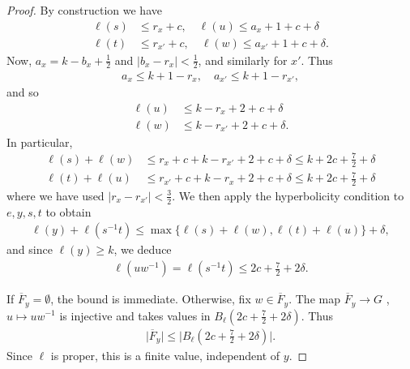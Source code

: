\documentclass[12pt,a4paper,oneside,final,reqno]{amsart}
\theoremstyle{plain}
\theoremstyle{definition}
\begin{document}
\begin{proof}
    By construction we have
    \begin{align*}
        \ell(s) &\leq r_{x} +c, \quad \ell(u) \leq a_x + 1 +c +\delta \\
        \ell(t) &\leq r_{x'} + c, \quad \ell(w) \leq a_{x'} +1+c+\delta.
    \end{align*}
    Now, $a_x = k - b_x + \frac{1}{2}$ and $|b_x - r_x | < \frac{1}{2}$, and similarly for $x'$. Thus
    \begin{align*}
        a_x \leq k+1 - r_x , \quad a_{x'} \leq k+1 - r_{x'},
    \end{align*}
    and so 
    \begin{align*}
        \ell(u) &\leq k-r_x +2+c+\delta \\ 
        \ell(w) &\leq k-r_{x'} +2 +c +\delta.
    \end{align*}
    In particular,
    \begin{align*}
        \ell(s) + \ell(w) &\leq r_x + c + k - r_{x'} +2 +c +\delta \leq k + 2c + \frac{7}{2} + \delta \\
        \ell(t) + \ell(u) &\leq r_{x'} + c + k - r_{x} +2+c+\delta \leq k + 2c  + \frac{7}{2} + \delta
    \end{align*}
    where we have used $|r_x - r_{x'}| < \frac{3}{2}$. 
    We then apply the hyperbolicity condition to $e,y,s,t$ to obtain
    \begin{align*}
        \ell(y) + \ell(s^{-1}t) \leq \max \{ \ell(s) + \ell(w), \ell(t) + \ell(u) \} +\delta ,
    \end{align*}
    and since $\ell(y) \geq k$, we deduce
    \begin{align*}
        \ell(u w^{-1}) = \ell(s^{-1}t) \leq 2c  + \frac{7}{2} + 2\delta.
    \end{align*}

    If $\overline{F}_y = \emptyset$, the bound is immediate. Otherwise,
    fix $w \in \overline{F}_y$. The map $\overline{F}_y \to G$ , $u \mapsto uw^{-1}$
    is injective and takes values in $B_\ell(2c +\frac{7}{2} + 2\delta )$. Thus
    \begin{align*}
        \vert \overline{F}_y \vert \leq | B_\ell(2c +\frac{7}{2} + 2\delta ) \vert.
    \end{align*}
    Since $\ell$ is proper, this is a finite value, independent of $y$. 


\end{proof}
\end{document}
